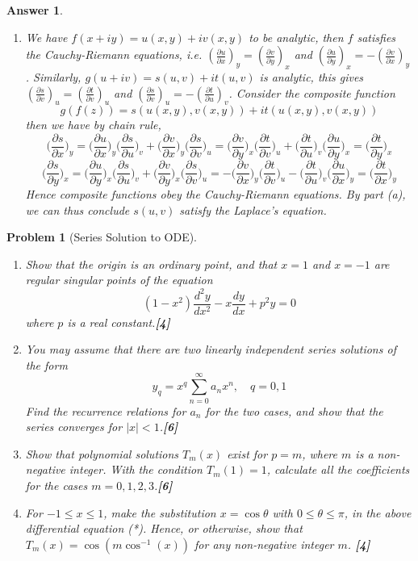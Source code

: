 \documentclass[a4paper]{article}
\newtheorem{ans}{Answer}[section]
\theoremstyle{new}
\newtheorem{qns}{Problem}[section]
\begin{document}
\begin{ans}
\begin{enumerate}[label=(\alph*)]
\begin{enumerate}[label=(\roman*)]
\item We have $f(x+iy)=u(x,y)+iv(x,y)$ to be analytic, then $f$ satisfies the Cauchy-Riemann equations, i.e. $(\frac{\partial u}{\partial x})_y=(\frac{\partial v}{\partial y})_x$ and $(\frac{\partial u}{\partial y})_x=-(\frac{\partial v}{\partial x})_y$. Similarly, $g(u+iv)=s(u,v)+it(u,v)$ is analytic, this gives $(\frac{\partial s}{\partial v})_u=(\frac{\partial t}{\partial v})_u$ and $(\frac{\partial s}{\partial v})_u=-(\frac{\partial t}{\partial u})_v$. Consider the composite function
$$g(f(z))=s(u(x,y),v(x,y))+it(u(x,y),v(x,y))$$
then we have by chain rule,
$$\bigg(\frac{\partial s}{\partial x}\bigg)_y=\bigg(\frac{\partial u}{\partial x}\bigg)_y\bigg(\frac{\partial s}{\partial u}\bigg)_v+\bigg(\frac{\partial v}{\partial x}\bigg)_y\bigg(\frac{\partial s}{\partial v}\bigg)_u=\bigg(\frac{\partial v}{\partial y}\bigg)_x\bigg(\frac{\partial t}{\partial v}\bigg)_u+\bigg(\frac{\partial t}{\partial u}\bigg)_v\bigg(\frac{\partial u}{\partial y}\bigg)_x=\bigg(\frac{\partial t}{\partial y}\bigg)_x$$
$$\bigg(\frac{\partial s}{\partial y}\bigg)_x=\bigg(\frac{\partial u}{\partial y}\bigg)_x\bigg(\frac{\partial s}{\partial u}\bigg)_v+\bigg(\frac{\partial v}{\partial y}\bigg)_x\bigg(\frac{\partial s}{\partial v}\bigg)_u=-\bigg(\frac{\partial v}{\partial x}\bigg)_y\bigg(\frac{\partial t}{\partial v}\bigg)_u-\bigg(\frac{\partial t}{\partial u}\bigg)_v\bigg(\frac{\partial u}{\partial x}\bigg)_y=\bigg(\frac{\partial t}{\partial x}\bigg)_y$$
Hence composite functions obey the Cauchy-Riemann equations. By part (a), we can thus conclude $s(u,v)$ satisfy the Laplace's equation.
\end{enumerate}
\end{enumerate}
\end{ans}
\newpage
\begin{qns}[Series Solution to ODE]\leavevmode
\begin{enumerate}[label=(\alph*)]
    \item Show that the origin is an ordinary point, and that $x=1$ and $x=-1$ are regular singular points of the equation
\begin{equation}
(1-x^2)\frac{d^2y}{dx^2}-x\frac{dy}{dx}+p^2y=0\tag{*}
\end{equation}
where $p$ is a real constant.\hfill \textbf{[4]}
\item You may assume that there are two linearly independent series solutions of the form $$y_q=x^q\sum_{n=0}^\infty a_nx^n, \quad q=0,1$$
Find the recurrence relations for $a_n$ for the two cases, and show that the series converges for $|x|<1$.\hfill \textbf{[6]}
\item Show that polynomial solutions $T_m(x)$ exist for $p=m$, where $m$ is a non-negative integer. With the condition $T_m(1)=1$, calculate all the coefficients for the cases $m=0,1,2,3$.\hfill \textbf{[6]}
\item For $-1\leq x\leq 1$, make the substitution $x=\cos\theta$ with $0\leq\theta\leq\pi$, in the above differential equation (*). Hence, or otherwise, show that $T_m(x)=\cos(m\cos^{-1}(x))$ for any non-negative integer $m$. \hfill \textbf{[4]}
\end{enumerate}
\end{qns}
\end{document}
